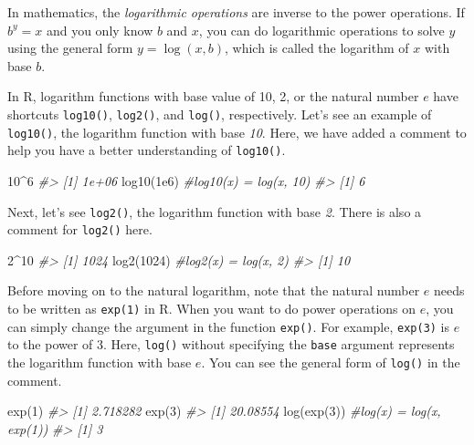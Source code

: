 \documentclass[
]{book}
\newenvironment{Shaded}{\begin{snugshade}}{\end{snugshade}}
\newcommand{\CommentTok}[1]{\textcolor[rgb]{0.56,0.35,0.01}{\textit{#1}}}
\newcommand{\DecValTok}[1]{\textcolor[rgb]{0.00,0.00,0.81}{#1}}
\newcommand{\FloatTok}[1]{\textcolor[rgb]{0.00,0.00,0.81}{#1}}
\newcommand{\FunctionTok}[1]{\textcolor[rgb]{0.00,0.00,0.00}{#1}}
\newcommand{\NormalTok}[1]{#1}
\newcommand{\SpecialCharTok}[1]{\textcolor[rgb]{0.00,0.00,0.00}{#1}}
\begin{document}
In mathematics, the \emph{logarithmic operations} are inverse to the power operations. If \textbf{\(b^y = x\)} and you only know \emph{\(b\)} and \emph{\(x\)}, you can do logarithmic operations to solve \emph{\(y\)} using the general form \textbf{\(y = \log(x, b)\)}, which is called the logarithm of \(x\) with base \(b\).

In R, logarithm functions with base value of 10, 2, or the natural number \(e\) have shortcuts \texttt{log10()}, \texttt{log2()}, and \texttt{log()}, respectively. Let's see an example of \texttt{log10()}, the logarithm function with base \emph{10}. Here, we have added a comment to help you have a better understanding of \texttt{log10()}.

\begin{Shaded}
\begin{Highlighting}[]
\DecValTok{10}\SpecialCharTok{\^{}}\DecValTok{6} 
\CommentTok{\#\textgreater{} [1] 1e+06}
\FunctionTok{log10}\NormalTok{(}\FloatTok{1e6}\NormalTok{) }\CommentTok{\#log10(x) = log(x, 10)}
\CommentTok{\#\textgreater{} [1] 6}
\end{Highlighting}
\end{Shaded}

Next, let's see \texttt{log2()}, the logarithm function with base \emph{2}. There is also a comment for \texttt{log2()} here.

\begin{Shaded}
\begin{Highlighting}[]
\DecValTok{2}\SpecialCharTok{\^{}}\DecValTok{10}
\CommentTok{\#\textgreater{} [1] 1024}
\FunctionTok{log2}\NormalTok{(}\DecValTok{1024}\NormalTok{)  }\CommentTok{\#log2(x) = log(x, 2)}
\CommentTok{\#\textgreater{} [1] 10}
\end{Highlighting}
\end{Shaded}

Before moving on to the natural logarithm, note that the natural number \(e\) needs to be written as \texttt{exp(1)} in R. When you want to do power operations on \(e\), you can simply change the argument in the function \texttt{exp()}. For example, \texttt{exp(3)} is \(e\) to the power of 3. Here, \texttt{log()} without specifying the \texttt{base} argument represents the logarithm function with base \(e\). You can see the general form of \texttt{log()} in the comment.

\begin{Shaded}
\begin{Highlighting}[]
\FunctionTok{exp}\NormalTok{(}\DecValTok{1}\NormalTok{)      }
\CommentTok{\#\textgreater{} [1] 2.718282}
\FunctionTok{exp}\NormalTok{(}\DecValTok{3}\NormalTok{)}
\CommentTok{\#\textgreater{} [1] 20.08554}
\FunctionTok{log}\NormalTok{(}\FunctionTok{exp}\NormalTok{(}\DecValTok{3}\NormalTok{))  }\CommentTok{\#log(x) = log(x, exp(1))}
\CommentTok{\#\textgreater{} [1] 3}
\end{Highlighting}
\end{Shaded}
\end{document}
